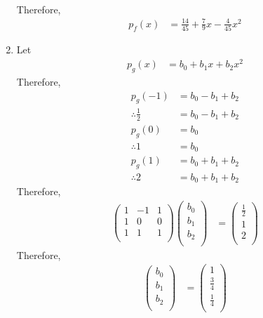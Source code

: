\documentclass[fleqn, a4paper, 11pt, oneside]{amsart}
\theoremstyle{definition}
\theoremstyle{theorem}
\begin{document}
\begin{solution}
\begin{enumerate}[leftmargin=*]
\begin{align*}
			\end{align*}
			Therefore,
			\begin{align*}
				p_f(x) &= \frac{14}{45} + \frac{7}{9} x - \frac{4}{45} x^2
			\end{align*}
		\item
			Let
			\begin{align*}
				p_g(x) &= b_0 + b_1 x + b_2 x^2
			\end{align*}
			Therefore,
			\begin{align*}
				p_g(-1) &= b_0 - b_1 + b_2\\
				\therefore \frac{1}{2} &= b_0 - b_1 + b_2\\
				p_g(0) &= b_0\\
				\therefore 1 &= b_0\\
				p_g(1) &= b_0 + b_1 + b_2\\
				\therefore 2 &= b_0 + b_1 + b_2
			\end{align*}
			Therefore,
			\begin{align*}
					\begin{pmatrix}
						1 & -1 & 1\\
						1 & 0 & 0\\
						1 & 1 & 1\\
					\end{pmatrix}
					\begin{pmatrix}
						b_0\\
						b_1\\
						b_2\\
					\end{pmatrix}
				&=
					\begin{pmatrix}
						\frac{1}{2}\\
						1\\
						2\\
					\end{pmatrix}
			\end{align*}
			Therefore,
			\begin{align*}
					\begin{pmatrix}
						b_0\\
						b_1\\
						b_2\\
					\end{pmatrix}
				&=
					\begin{pmatrix}
						1\\
						\frac{3}{4}\\
						\frac{1}{4}\\
					\end{pmatrix}

\end{align*}
\end{enumerate}
\end{solution}
\end{document}
